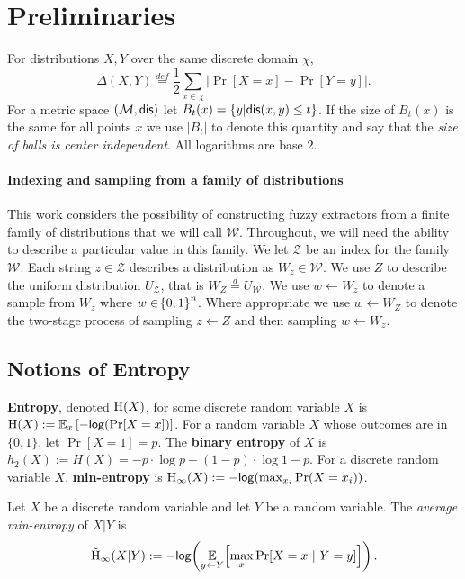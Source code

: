 
\section{Preliminaries}
\label{sec:prelim}
For distributions $X, Y$ over the same discrete domain $\chi$,
\[
\Delta(X, Y)\overset{def}= \frac{1}{2}\sum_{x \in \chi} \left| \Pr[X=x] - \Pr[Y=y]\right|.
\]
For a metric space $(\mathcal{M}, \mathsf{dis})$ let $B_t(x) = \{y | \mathsf{dis}(x, y)\le t\}$. If the size of $B_t(x)$ is the same for all points $x$ we use $|B_t|$ to denote this quantity and say that the \emph{size of balls is center independent}.  All logarithms are base $2$.

\paragraph{Indexing and sampling from a family of distributions}
This work considers the possibility of constructing fuzzy extractors from a finite family of distributions that we will call $\mathcal{W}$. 
Throughout, we will need the ability to describe a particular value in this family.  
We let $\mathcal{Z}$ be an index for the family $\mathcal{W}$. Each string $z\in\mathcal{Z}$ describes a distribution as $W_z \in \mathcal{W}$. We use $Z$ to describe the uniform distribution $U_{\mathcal{Z}}$, that is $W_Z \overset{d}= U_{\mathcal{W}}$.  We use $w\leftarrow W_z$ to denote a sample from $W_z$ where  $w \in \!\left\{ 0,1 \right\}^{n}$.  Where appropriate we use $w\leftarrow W_Z$ to denote the two-stage process of sampling $z\leftarrow Z$ and then sampling $w\leftarrow W_z$.


\subsection{Notions of Entropy}
    \textbf{Entropy}, denoted $\mathrm{H}\!\left(X\right)$, for some discrete random variable $X$ is $\mathrm{H}\!\left(X\right) := \operatorname*{\mathbb{E}}_x\left[-\mathsf{log}\!\left(\Pr[X=x]\right)\right]$. 
    For a random variable $X$ whose outcomes are in $\{0,1\}$, let $\Pr[X=1] = p$. The \textbf{binary entropy} of $X$ is  $h_2(X) :=H(X)=-p\cdot\log{p} - (1-p)\cdot\log{1-p}.$ 
For a discrete random variable $X$, 
    \textbf{min-entropy} is $\mathrm{H}_{\infty}\!\left(X\right) := -\mathsf{log}\!\left(\max_{x_i} \Pr(X=x_i)\right)$.  
\begin{definition}
Let $X$ be a discrete random variable and let $Y$ be a random variable.  The \emph{average min-entropy} of $X|Y$ is  \[ \tilde{\mathrm{H}}_{\infty}\!\left(X|Y\right) := -\mathsf{log}\!\left(\operatorname*{\mathbb{E}}\limits_{y \leftarrow Y}\!\left[\max\limits_{x} \Pr\!\left[X = x\ |\ Y = y\right]\right]\right).\] 
\end{definition}

